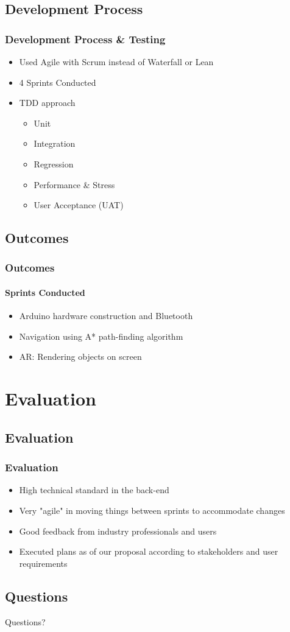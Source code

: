 \documentclass[compress]{beamer}
\begin{document}
	\subsection{Development Process}
	\begin{frame}
	    \frametitle{Development Process \& Testing}
		\begin{itemize}
			\item Used Agile with Scrum instead of Waterfall or Lean
			\vfill
			\item 4 Sprints Conducted
			\vfill
			\item TDD approach
			\begin{itemize}
				\item Unit
				\item Integration
				\item Regression
				\item Performance \& Stress
				\item User Acceptance (UAT)
			\end{itemize}
		\end{itemize}
	\end{frame}

	\subsection{Outcomes}
	\begin{frame}
		\frametitle{Outcomes}

		\framesubtitle{Sprints Conducted}
		\begin{itemize}
			\item Arduino hardware construction and Bluetooth
			\vfill
			\item Navigation using A* path-finding algorithm
			\vfill
			\item AR: Rendering objects on screen
		\end{itemize}
	\end{frame}

	\section{Evaluation}
	\subsection{Evaluation}
		\begin{frame}
			\frametitle{Evaluation}
			\begin{itemize}
				\item High technical standard in the back-end
				\vfill
				\item Very "agile" in moving things between sprints to accommodate changes
				\vfill
				\item Good feedback from industry professionals and users
				\vfill
				\item Executed plans as of our proposal according to stakeholders and user requirements
			\end{itemize}
		\end{frame}

	\subsection{Questions}
	\begin{frame}
		\begin{center}
			\Huge Questions?
		\end{center}
	\end{frame}
\end{document}
